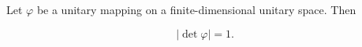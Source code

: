 Let $\varphi$ be a unitary mapping on a finite-dimensional unitary space. Then

$$|\det \varphi| = 1.$$
